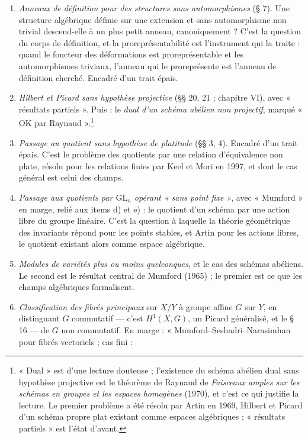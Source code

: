 \documentclass[11pt,a4paper]{article}
\begin{document}
\begin{enumerate}
  \item[a)] \emph{Anneaux de définition pour des structures sans
  automorphismes} (§ 7). Une structure algébrique définie sur une extension
  et sans automorphisme non trivial descend-elle à un plus petit anneau,
  canoniquement ? C'est la question du corps de définition, et la
  proreprésentabilité est l'instrument qui la traite : quand le foncteur des
  déformations est proreprésentable et les automorphismes triviaux, l'anneau
  qui le proreprésente est l'anneau de définition cherché. Encadré d'un trait
  épais.
  \item[b)] \emph{Hilbert et Picard sans hypothèse projective} (§§ 20, 21 ;
  chapitre VI), avec « résultats partiels ». Puis : le \emph{dual d'un schéma
  abélien non projectif}, marqué « OK par Raynaud ».\footnote{« Dual » est
  d'une lecture douteuse ; l'existence du schéma abélien dual sans hypothèse
  projective est le théorème de Raynaud de \emph{Faisceaux amples sur les
  schémas en groupes et les espaces homogènes} (1970), et c'est ce qui
  justifie la lecture. Le premier problème a été résolu par Artin en 1969,
  Hilbert et Picard d'un schéma propre plat existant comme espaces
  algébriques ; « résultats partiels » est l'état d'avant.}
  \item[c)] \emph{Passage au quotient sans hypothèse de platitude} (§§ 3, 4).
  Encadré d'un trait épais. C'est le problème des quotients par une relation
  d'équivalence non plate, résolu pour les relations finies par Keel et Mori
  en 1997, et dont le cas général est celui des champs.
  \item[d)] \emph{Passage aux quotients par $\mathrm{GL}_n$ opérant « sans
  point fixe »}, avec « Mumford » en marge, relié aux items d) et e) : le
  quotient d'un schéma par une action libre du groupe linéaire. C'est la
  question à laquelle la théorie géométrique des invariants répond pour les
  points stables, et Artin pour les actions libres, le quotient existant alors
  comme espace algébrique.
  \item[e)] \emph{Modules de variétés plus ou moins quelconques}, et le cas des
  schémas abéliens. Le second est le résultat central de Mumford (1965) ; le
  premier est ce que les champs algébriques formalisent.
  \item[f)] \emph{Classification des fibrés principaux} sur $X/Y$ à groupe
  affine $G$ sur $Y$, en distinguant $G$ commutatif — c'est $H^1(X, G)$, un
  Picard généralisé, et le § 16 — de $G$ non commutatif. En marge :
  « Mumford--Seshadri--Narasimhan pour fibrés vectoriels ; cas fini :

\end{enumerate}
\end{document}
